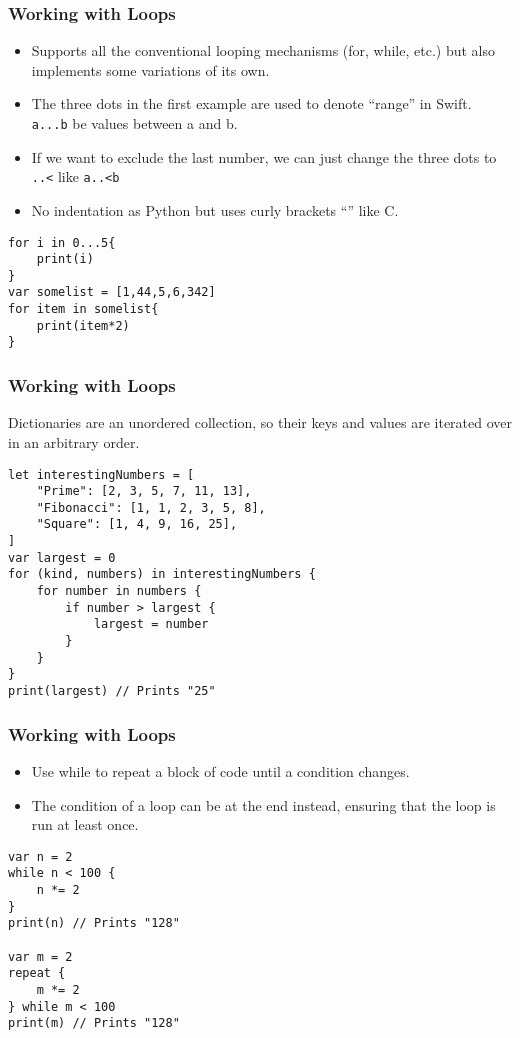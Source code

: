 \begin{frame}[fragile] \frametitle{Working with Loops}

\begin{itemize}
\item Supports all the conventional looping mechanisms (for, while, etc.) but also implements some variations of its own.
\item The three dots in the first example are used to denote ``range'' in Swift. \lstinline|a...b| be values between a and b.
\item If we want to exclude the last number, we can just change the three dots to \lstinline|..<| like \lstinline|a..<b|
\item No indentation as Python but uses curly brackets ``{}'' like C.
\end{itemize}

\begin{lstlisting}
for i in 0...5{
	print(i)
}
var somelist = [1,44,5,6,342]
for item in somelist{
	print(item*2)
}
\end{lstlisting}
\end{frame}


\begin{frame}[fragile] \frametitle{Working with Loops}

Dictionaries are an unordered collection, so their keys and values are iterated over in an arbitrary order.

\begin{lstlisting}
let interestingNumbers = [
    "Prime": [2, 3, 5, 7, 11, 13],
    "Fibonacci": [1, 1, 2, 3, 5, 8],
    "Square": [1, 4, 9, 16, 25],
]
var largest = 0
for (kind, numbers) in interestingNumbers {
    for number in numbers {
        if number > largest {
            largest = number
        }
    }
}
print(largest) // Prints "25"
\end{lstlisting}
\end{frame}

\begin{frame}[fragile] \frametitle{Working with Loops}

\begin{itemize}
\item Use while to repeat a block of code until a condition changes. 
\item The condition of a loop can be at the end instead, ensuring that the loop is run at least once.
\end{itemize}

\begin{lstlisting}
var n = 2
while n < 100 {
    n *= 2
}
print(n) // Prints "128"

var m = 2
repeat {
    m *= 2
} while m < 100
print(m) // Prints "128"
\end{lstlisting}
\end{frame}

